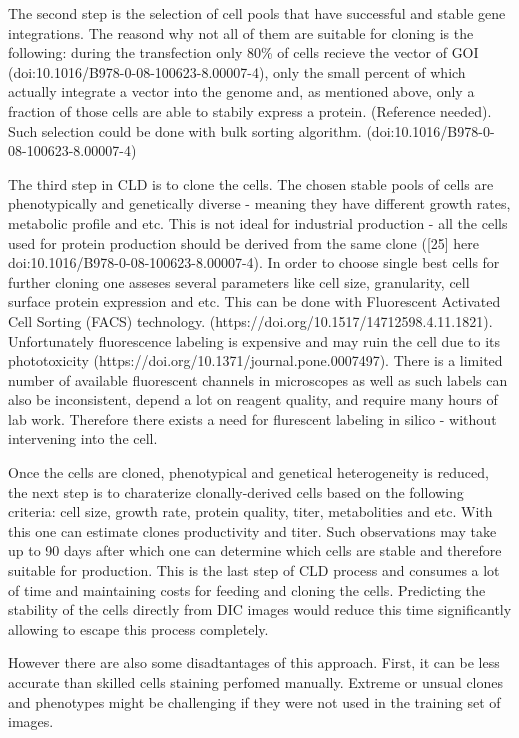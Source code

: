 The second step is the selection of cell pools that have successful and stable gene integrations. The reasond why not all of them are suitable for cloning is the following: during the transfection only 80\% of cells recieve the vector of GOI (doi:10.1016/B978-0-08-100623-8.00007-4), only the small percent of which actually integrate a vector into the genome and, as mentioned above, only a fraction of those cells are able to stabily express a protein. (Reference needed). Such selection could be done with bulk sorting algorithm. (doi:10.1016/B978-0-08-100623-8.00007-4)

The third step in CLD is to clone the cells. The chosen stable pools of cells are phenotypically and genetically diverse - meaning they have different growth rates, metabolic profile and etc. This is not ideal for industrial production - all the cells used for protein production should be derived from the same clone ([25] here doi:10.1016/B978-0-08-100623-8.00007-4). In order to choose single best cells for further cloning one asseses several parameters like cell size, granularity, cell surface protein expression and etc. This can be done with Fluorescent Activated Cell Sorting (FACS) technology. (https://doi.org/10.1517/14712598.4.11.1821). Unfortunately fluorescence labeling is expensive and may ruin the cell due to its phototoxicity (https://doi.org/10.1371/journal.pone.0007497). There is a limited number of available fluorescent channels in microscopes as well as such labels can also be inconsistent, depend a lot on reagent quality, and require many hours of lab work. Therefore there exists a need for flurescent labeling in silico - without intervening into the cell. 

Once the cells are cloned, phenotypical and genetical heterogeneity is reduced, the next step is to charaterize clonally-derived cells based on the following criteria: cell size, growth rate, protein quality, titer, metabolities and etc. With this one can estimate clones productivity and titer. Such observations may take up to 90 days after which one can determine which cells are stable and therefore suitable for production. This is the last step of CLD process and consumes a lot of time and maintaining costs for feeding and cloning the cells. Predicting the stability of the cells directly from DIC images would reduce this time significantly allowing to escape this process completely.

However there are also some disadtantages of this approach. First, it can be less accurate than skilled cells staining perfomed manually. Extreme or unsual clones and phenotypes might be challenging if they were not used in the training set of images.

